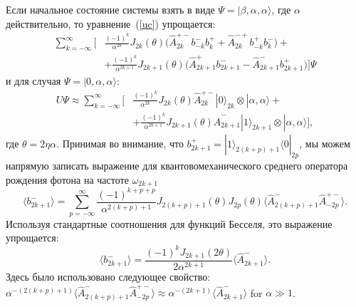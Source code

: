 Если начальное состояние системы взять в виде $\Psi = |\beta,\alpha,\alpha\rangle$, где $\alpha$ действительно, то уравнение~(\ref{uc}) упрощается: 
\begin{equation}
	\begin{split}
	\sum_{k=-\infty}^{\infty} \bigg[&\frac{(-1)^k}{\alpha^{2k}}J_{2k}(\theta)\Big(\hat{A}_{2k}^{+-} b^-_{-k} b^+_{k} +\hat{A}_{2k}^{-+} b^+_{-k} b^-_{k} \Big) + \\
	&+ \frac{(-1)^k}{\alpha^{2k+1}}J_{2k+1}(\theta)\Big(\hat{A}_{2k+1}^{+} b^-_{2k+1} - \hat{A}_{2k+1}^{-} b^+_{2k+1}\Big)\bigg] \Psi
	\end{split}
\end{equation}
и для случая $\Psi = |0,\alpha,\alpha\rangle$:
\begin{equation}
	\begin{split}
	U\Psi \approx \sum_{k=-\infty}^{\infty} \bigg[&\frac{(-1)^k}{\alpha^{2k}}J_{2k}(\theta)\hat{A}_{2k}^{+-} |0\rangle_{2k} \otimes|\alpha,\alpha\rangle +\\
	&+ \frac{(-1)^k}{\alpha^{2k+1}}J_{2k+1}(\theta)\hat{A}_{2k+1}^{-} |1\rangle_{2k+1} \otimes|\alpha,\alpha\rangle \bigg], 
	\end{split}
\end{equation}
где $\theta = 2\eta\alpha$. 
Принимая во внимание, что
$b^+_{2k+1} = |1\rangle_{2(k+p)+1}\langle 0|_{2p}$, мы можем напрямую записать выражение для квантовомеханического среднего оператора рождения фотона на частоте $\omega_{2k+1}$
\begin{equation}
	\langle b^-_{2k+1}\rangle =  \sum_{p=-\infty}^{\infty} \frac{(-1)^{k+p+p}}{\alpha^{2(k+p)+1}}J_{2(k+p)+1}(\theta)J_{2p}(\theta)\langle \hat{A}_{2(k+p)+1}^{-}\hat{A}_{-2p}^{+-}\rangle. 
\end{equation}
Используя стандартные соотношения для функций Бесселя, это выражение упрощается: 
\begin{equation}
	\langle b^-_{2k+1}\rangle = \frac{(-1)^kJ_{2k+1}(2\theta)}{2\alpha^{2k+1}}\langle\hat{A}_{2k+1}^{-}\rangle.
	\label{b22}
\end{equation}
Здесь было использовано следующее свойство: $\alpha^{-(2(k+p)+1)} \langle \hat{A}_{2(k+p)+1}^{-}\hat{A}_{-2p}^{+-} \rangle \approx\alpha^{-(2k+1)}\langle \hat{A}_{2k+1}^{-} \rangle$ for $\alpha \gg 1$.
